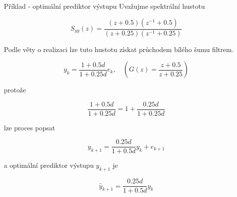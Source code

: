 \begin{note}{Příklad - optimální prediktor výstupu}
Uvažujme spektrální hustotu

\[ S_{yy}(z) = \frac{(z+0.5)(z^{-1}+0.5)}{(z+0.25)(z^{-1}+0.25)} \]

Podle věty o realizaci lze tuto hustotu získat průchodem bílého šumu filtrem.

\[ y_k = \frac{1+0.5d}{1+0.25d}e_k,\quad \left(G(z) = \frac{z+0.5}{z+0.25}\right) \]

protože

\[ \frac{1+0.5d}{1+0.25d} = 1+\frac{0.25d}{1+0.25d} \]

lze proces popsat

\[ y_{k+1} = \frac{0.25d}{1+0.5d}y_k+e_{k+1} \]

a optimální prediktor výstupu $y_{k+1}$ je

\[ \widehat{y}_{k+1} = \frac{0.25d}{1+0.5d}y_k \] 

\end{note}